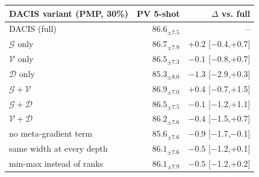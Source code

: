 \begin{tabular}{@{}lrr@{}}
\toprule
DACIS variant (PMP, 30\%) & PV 5-shot & $\Delta$ vs. full \\
\midrule
DACIS (full) & $86.6_{\pm7.5}$ & -- \\
$\mathcal{G}$ only & $86.7_{\pm7.9}$ & $+0.2$ {\scriptsize[\ensuremath{-}0.4,+0.7]} \\
$\mathcal{V}$ only & $86.5_{\pm7.3}$ & $\ensuremath{-}0.1$ {\scriptsize[\ensuremath{-}0.8,+0.7]} \\
$\mathcal{D}$ only & $85.3_{\pm8.0}$ & $\ensuremath{-}1.3$ {\scriptsize[\ensuremath{-}2.9,+0.3]} \\
$\mathcal{G}{+}\mathcal{V}$ & $86.9_{\pm7.0}$ & $+0.4$ {\scriptsize[\ensuremath{-}0.7,+1.5]} \\
$\mathcal{G}{+}\mathcal{D}$ & $86.5_{\pm7.5}$ & $\ensuremath{-}0.1$ {\scriptsize[\ensuremath{-}1.2,+1.1]} \\
$\mathcal{V}{+}\mathcal{D}$ & $86.2_{\pm7.6}$ & $\ensuremath{-}0.4$ {\scriptsize[\ensuremath{-}1.5,+0.7]} \\
\midrule
no meta-gradient term & $85.6_{\pm7.6}$ & $\ensuremath{-}0.9$ {\scriptsize[\ensuremath{-}1.7,\ensuremath{-}0.1]} \\
same width at every depth & $86.1_{\pm7.6}$ & $\ensuremath{-}0.5$ {\scriptsize[\ensuremath{-}1.2,+0.1]} \\
min-max instead of ranks & $86.1_{\pm7.9}$ & $\ensuremath{-}0.5$ {\scriptsize[\ensuremath{-}1.2,+0.2]} \\
\bottomrule
\end{tabular}